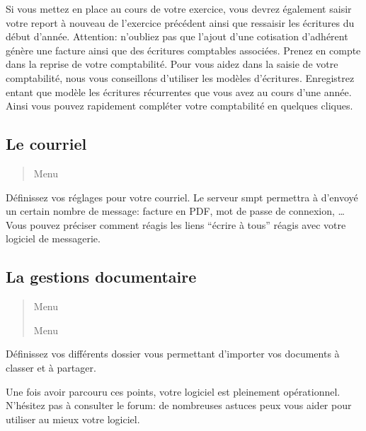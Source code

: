 \documentclass[a4paper,10pt,oneside,french]{sphinxmanual}
\begin{document}
\sphinxAtStartPar
Si vous mettez en place  au cours de votre exercice, vous devrez également saisir votre report à nouveau de l’exercice précédent ainsi que ressaisir les écritures du début d’année.
Attention: n’oubliez pas que l’ajout d’une cotisation d’adhérent génère une facture ainsi que des écritures comptables associées. Prenez en compte dans la reprise de votre comptabilité.
Pour vous aidez dans la saisie de votre comptabilité, nous vous conseillons d’utiliser les modèles d’écritures. Enregistrez entant que modèle les écritures récurrentes que vous avez au cours d’une année. Ainsi vous pouvez rapidement compléter votre comptabilité en quelques cliques.


\subsection{Le courriel}
\label{\detokenize{pro/first_step:le-courriel}}\begin{quote}

\sphinxAtStartPar
Menu 
\end{quote}

\sphinxAtStartPar
Définissez vos réglages pour votre courriel.
Le serveur smpt permettra à  d’envoyé un certain nombre de message: facture en PDF, mot de passe de connexion, …
Vous pouvez préciser comment réagis les liens “écrire à tous” réagis avec votre logiciel de messagerie.


\subsection{La gestions documentaire}
\label{\detokenize{pro/first_step:la-gestions-documentaire}}\begin{quote}

\sphinxAtStartPar
Menu 

\sphinxAtStartPar
Menu 
\end{quote}

\sphinxAtStartPar
Définissez vos différents dossier vous permettant d’importer vos documents à classer et à partager.

\sphinxAtStartPar
Une fois avoir parcouru ces points, votre logiciel  est pleinement opérationnel.
N’hésitez pas à consulter le forum: de nombreuses astuces peux vous aider pour utiliser au mieux votre logiciel.



\renewcommand{\indexname}{Index}
\printindex
\end{document}
